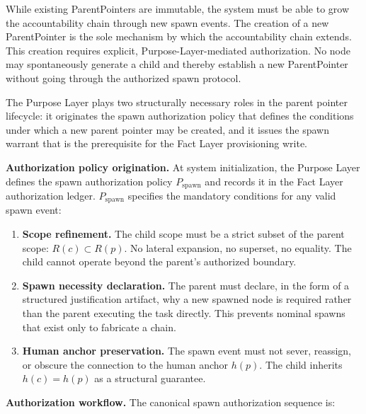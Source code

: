 While existing ParentPointers are immutable, the system must be able to grow the accountability chain through new spawn events. The creation of a new ParentPointer is the sole mechanism by which the accountability chain extends. This creation requires explicit, Purpose-Layer-mediated authorization. No node may spontaneously generate a child and thereby establish a new ParentPointer without going through the authorized spawn protocol.

The Purpose Layer plays two structurally necessary roles in the parent pointer lifecycle: it originates the spawn authorization policy that defines the conditions under which a new parent pointer may be created, and it issues the spawn warrant that is the prerequisite for the Fact Layer provisioning write.

\medskip
\noindent\textbf{Authorization policy origination.} At system initialization, the Purpose Layer defines the spawn authorization policy $P_{\mathrm{spawn}}$ and records it in the Fact Layer authorization ledger. $P_{\mathrm{spawn}}$ specifies the mandatory conditions for any valid spawn event:

\begin{enumerate}
    \item[(S1)] \textbf{Scope refinement.} The child scope must be a strict subset of the parent scope: $R(c) \subset R(p)$. No lateral expansion, no superset, no equality. The child cannot operate beyond the parent's authorized boundary.
    \item[(S2)] \textbf{Spawn necessity declaration.} The parent must declare, in the form of a structured justification artifact, why a new spawned node is required rather than the parent executing the task directly. This prevents nominal spawns that exist only to fabricate a chain.
    \item[(S3)] \textbf{Human anchor preservation.} The spawn event must not sever, reassign, or obscure the connection to the human anchor $h(p)$. The child inherits $h(c) = h(p)$ as a structural guarantee.
\end{enumerate}

\medskip
\noindent\textbf{Authorization workflow.} The canonical spawn authorization sequence is:


